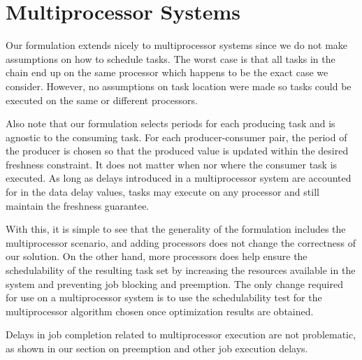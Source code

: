 \section{Multiprocessor Systems}

Our formulation extends nicely to multiprocessor systems since we do not make assumptions on how to schedule tasks. The worst case is that all tasks in the chain end up on the same processor which happens to be the exact case we consider. However, no assumptions on task location were made so tasks could be executed on the same or different processors.

Also note that our formulation selects periods for each producing task and is agnostic to the consuming task. For each producer-consumer pair, the period of the producer is chosen so that the produced value is updated within the desired freshness constraint. It does not matter when nor where the consumer task is executed. As long as delays introduced in a multiprocessor system are accounted for in the data delay values, tasks may execute on any processor and still maintain the freshness guarantee.

With this, it is simple to see that the generality of the formulation includes the multiprocessor scenario, and adding processors does not change the correctness of our solution. On the other hand, more processors does help ensure the schedulability of the resulting task set by increasing the resources available in the system and preventing job blocking and preemption. The only change required for use on a multiprocessor system is to use the schedulability test for the multiprocessor algorithm chosen once optimization results are obtained.

Delays in job completion related to multiprocessor execution are not problematic, as shown in our section on preemption and other job execution delays.